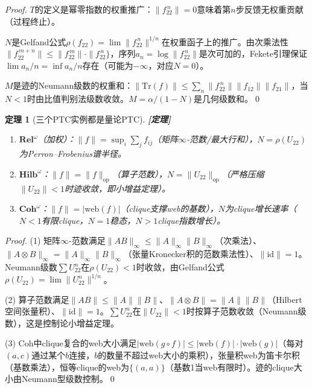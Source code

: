 \documentclass[11pt,a4paper]{article}
\newtheorem{theorem}{定理}
\newcommand{\lvl}[1]{\hfill\textbf{\footnotesize[#1]}}
\newcommand{\lvP}{\lvl{定理}}
\begin{document}
\begin{proof}
$T$的定义是幂零指数的权重推广：$\|f_{22}^{\,n}\|=0$意味着第$n$步反馈无权重贡献（过程终止）。

$N$是Gelfand公式$\rho(f_{22})=\lim\|f_{22}^{\,n}\|^{1/n}$在权重函子上的推广。由次乘法性$\|f_{22}^{\,m+n}\|\leq\|f_{22}^{\,m}\|\cdot\|f_{22}^{\,n}\}$，序列$a_n=\log\|f_{22}^{\,n}\|$是次可加的，Fekete引理保证$\lim a_n/n=\inf a_n/n$存在（可能为$-\infty$，对应$N=0$）。

$M$是迹的Neumann级数的权重和：$\|\mathrm{Tr}(f)\|\leq\sum_n\|f_{22}^{\,n}\|\|f_{12}\|\|f_{21}\|$，当$N<1$时由比值判别法级数收敛。$M=\alpha/(1-N)$是几何级数和。\qed
\end{proof}

\begin{theorem}[三个PTC实例都是量论PTC]\label{thm:three-qptc}\lvP
\begin{enumerate}
  \item $\mathbf{Rel}^\omega$（加权）：$\|f\|=\sup_i\sum_j f_{ij}$（矩阵$\infty$-范数/最大行和），$N=\rho(U_{22})$为Perron--Frobenius谱半径。
  \item $\mathbf{Hilb}^\omega$：$\|f\|=\|f\|_{\mathrm{op}}$（算子范数），$N=\|U_{22}\|_{\mathrm{op}}$（严格压缩$\|U_{22}\|<1$时迹收敛，即小增益定理）。
  \item $\mathbf{Coh}^\omega$：$\|f\|=|\mathrm{web}(f)|$（clique支撑web的基数），$N$为clique增长速率（$N<1$有限clique，$N=1$稳态，$N>1$clique指数增长）。
\end{enumerate}
\end{theorem}

\begin{proof}
(1) 矩阵$\infty$-范数满足$\|AB\|_\infty\leq\|A\|_\infty\|B\|_\infty$（次乘法）、$\|A\otimes B\|_\infty=\|A\|_\infty\|B\|_\infty$（张量Kronecker积的范数乘法性）、$\|\mathrm{id}\|=1$。Neumann级数$\sum U_{22}^n$在$\rho(U_{22})<1$时收敛，由Gelfand公式$\rho(U_{22})=\lim\|U_{22}^n\|^{1/n}$。

(2) 算子范数满足$\|AB\|\leq\|A\|\|B\|$、$\|A\otimes B\|=\|A\|\|B\|$（Hilbert空间张量积）、$\|\mathrm{id}\|=1$。$\sum U_{22}^n$在$\|U_{22}\|<1$时按算子范数收敛（Neumann级数），这是控制论小增益定理。

(3) Coh中clique复合的web大小满足$|\mathrm{web}(g\circ f)|\leq|\mathrm{web}(f)|\cdot|\mathrm{web}(g)|$（每对$(a,c)$通过某个$b$连接，$b$的数量不超过web大小的乘积），张量积web为笛卡尔积（基数乘法），恒等clique的web为$\{(a,a)\}$（基数1当web有限时）。迹的clique大小由Neumann型级数控制。\qed
\end{proof}
\end{document}
